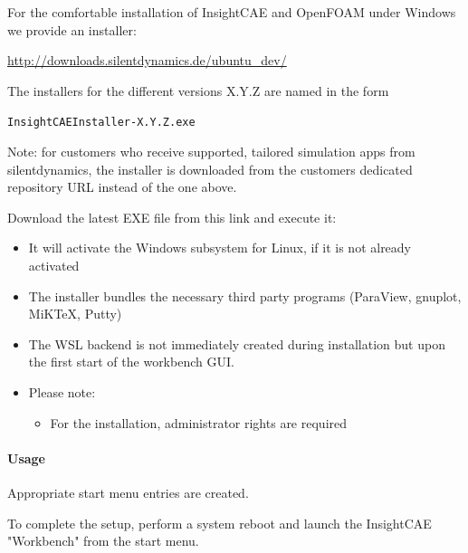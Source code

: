 For the comfortable installation of InsightCAE and OpenFOAM under Windows we provide an installer:

\url{http://downloads.silentdynamics.de/ubuntu_dev/}

The installers for the different versions X.Y.Z are named in the form 

\texttt{InsightCAEInstaller-X.Y.Z.exe}

Note: for customers who receive supported, tailored simulation apps from silentdynamics, the installer is downloaded from the customers dedicated repository URL instead of the one above.

Download the latest EXE file from this link and execute it:

\begin{itemize}
\item It will activate the Windows subsystem for Linux, if it is not already activated
\item The installer bundles the necessary third party programs (ParaView, gnuplot, MiKTeX, Putty)
\item The WSL backend is not immediately created during installation but upon the first start of the workbench GUI.
\item Please note:
\begin{itemize}
\item For the installation, administrator rights are required
\end{itemize}
\end{itemize}

\paragraph{Usage}

Appropriate start menu entries are created.

To complete the setup, perform a system reboot and launch the InsightCAE "Workbench" from the start menu.

